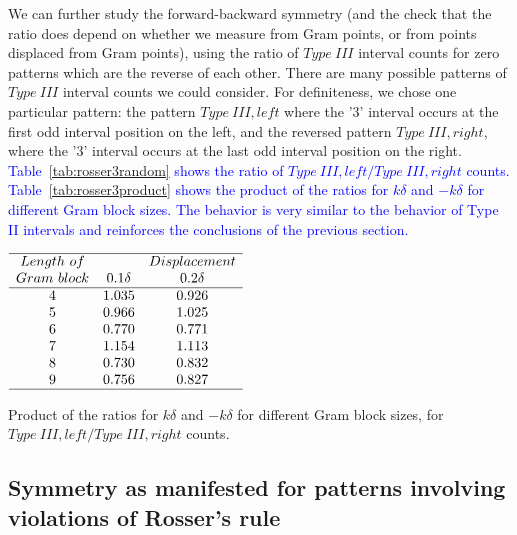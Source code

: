 \documentclass[twoside]{article}
\theoremstyle{definition}
\begin{document}
{We can further study the forward-backward symmetry (and the check that the ratio does depend on whether we measure from Gram points, or from points displaced from Gram points),  using the ratio of $Type~III$ interval counts for zero patterns which are the reverse of each other. There are many possible patterns of $Type~III$ interval counts we could consider. For definiteness, we chose one particular pattern: the pattern  $Type~III,left$  where the '3' interval occurs at the first odd interval position on the left, and the reversed pattern  $Type~III,right$,  where the '3' interval occurs at the last odd interval position on the right. \textcolor{blue}{
Table~\ref{tab:rosser3random} shows the ratio of $Type~III,left/Type~III,right$ counts. Table~\ref{tab:rosser3product} shows the product of the ratios for $k\delta$ and $-k\delta$ for different Gram block sizes.   The behavior  is very similar to the behavior of Type II intervals and reinforces the conclusions of the previous section.}


\begin{table}
\centering \(\begin{array}{ccc}
\hline
Length~of 	& &Displacement \\
Gram~block	 & 0.1\delta & 0.2\delta  \\
\hline
4 &1.035 & 0.926\\
5 &0.966& 1.025\\ 
6 &0.770& 0.771\\
7 &1.154& 1.113\\
8 &0.730& 0.832\\
9 &0.756& 0.827\\
\hline
\end{array}\)
\caption{ {Product of the ratios for $k\delta$ and $-k\delta$ for different Gram block sizes, for  $Type~III,left/Type~III,right$ counts.}}
\label{tab:rosser3product}
\end{table}


\subsection{\label{sec6a}Symmetry as manifested for patterns involving violations of Rosser's rule}

}
\end{document}
